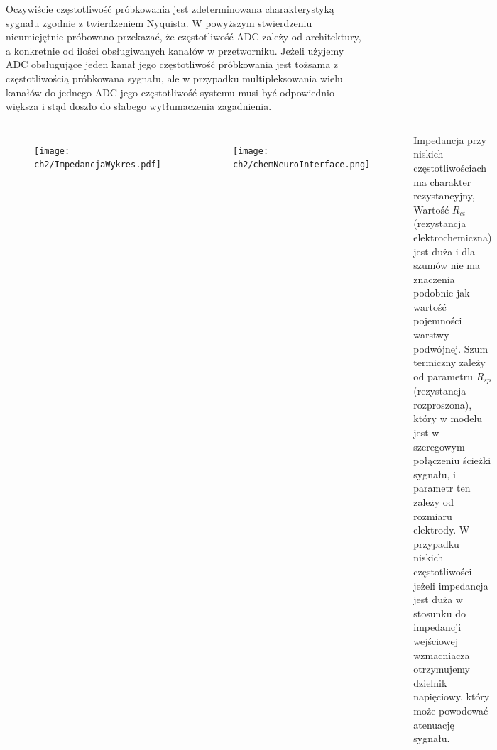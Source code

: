 \begin{frame}[t]
    \begin{block}{\dk}
    \end{block}
    Oczywiście częstotliwość próbkowania jest zdeterminowana charakterystyką sygnału zgodnie z twierdzeniem Nyquista.
    W powyższym stwierdzeniu nieumiejętnie próbowano przekazać, że częstotliwość ADC zależy od architektury, a konkretnie od ilości obsługiwanych kanałów w przetworniku.
    Jeżeli użyjemy ADC obsługujące jeden kanał jego częstotliwość próbkowania jest tożsama z częstotliwością próbkowana sygnału, ale w przypadku multipleksowania wielu kanałów do jednego ADC  jego częstotliwość systemu musi być  odpowiednio większa i stąd doszło do słabego wytłumaczenia zagadnienia.
 
\end{frame}

\begin{frame}[t]
    \begin{block}{\dk}
    \end{block}

    \begin{columns}

        \vspace{-1em}
        \begin{figure}[H]
            \texttt{[image: ch2/ImpedancjaWykres.pdf]}
        \end{figure}
        \vspace{-1em}
        \begin{figure}[H]
            \texttt{[image: ch2/chemNeuroInterface.png]}
        \end{figure}
    
        Impedancja przy niskich częstotliwościach ma charakter rezystancyjny, Wartość $R_{ct}$ (rezystancja elektrochemiczna) jest duża i dla szumów nie ma znaczenia podobnie jak wartość pojemności warstwy podwójnej.  Szum termiczny zależy od parametru $R_{sp}$ (rezystancja rozproszona), który w modelu jest w szeregowym połączeniu ścieżki sygnału, i parametr ten zależy  od rozmiaru elektrody.
        W przypadku niskich częstotliwości jeżeli impedancja jest duża w stosunku do impedancji wejściowej wzmacniacza otrzymujemy dzielnik napięciowy, który może powodować atenuację sygnału. 
        
    \end{columns}
\end{frame}

